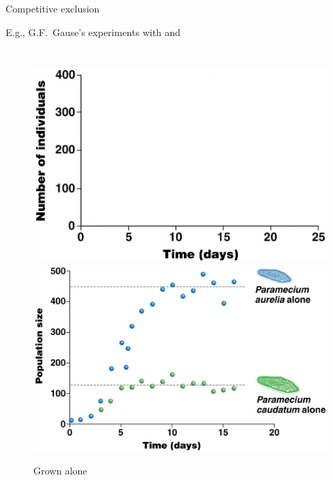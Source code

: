 \begin{frame}[t]
    \begin{adjustwidth}{-2em}{-1.5em}
        \vspace{-2mm}
        Competitive exclusion

        \vspace{2mm}
        E.g., G.F.\ Gause's experiments with  and

        \begin{columns}[b]


            \begin{figure}
                \ifhide%
                    \includegraphics[width=\columnwidth]{paramecium-exclusion-blank.png}
                \else%
                    \includegraphics[width=\columnwidth]{paramecium-growth.png}
                \fi
                \caption{\Large Grown alone}
            \end{figure}


\end{columns}
\end{adjustwidth}
\end{frame}
